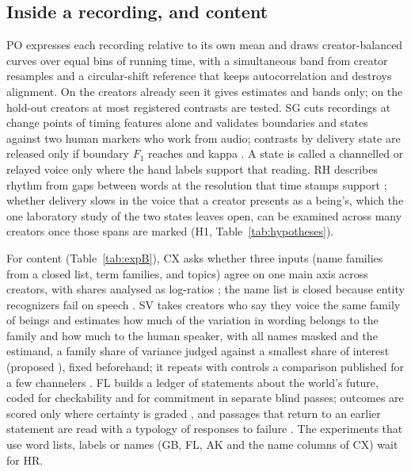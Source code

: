 \documentclass[letterpaper]{article} %
\newcommand{\expid}[1]{\textsc{#1}}
\begin{document}
\subsection{Inside a recording, and content}

\expid{PO} expresses each recording relative to its own mean and draws creator-balanced curves over \PoBins{} equal bins of running time, with a simultaneous band from \NResamples{} creator resamples and a circular-shift reference that keeps autocorrelation and destroys alignment. On the creators already seen it gives estimates and bands only; on the hold-out creators at most \PoMaxContrasts{} registered contrasts are tested. \expid{SG} cuts recordings at change points of timing features alone and validates boundaries and states against two human markers who work from audio; contrasts by delivery state are released only if boundary $F_1$ reaches \SgBoundaryGate{} and kappa \SgKappaGate. A state is called a channelled or relayed voice only where the hand labels support that reading. \expid{RH} describes rhythm from gaps between words at the resolution that time stamps support \cite{rousso2024tradition}; whether delivery slows in the voice that a creator presents as a being's, which the one laboratory study of the two states \cite{wahbeh2019physiological} leaves open, can be examined across many creators once those spans are marked (H1, Table~\ref{tab:hypotheses}).

For content (Table~\ref{tab:expB}), \expid{CX} asks whether three inputs (name families from a closed list, term families, and topics) agree on one main axis across creators, with shares analysed as log-ratios \cite{aitchison1982statistical,lovell2015proportionality}; the name list is closed because entity recognizers fail on speech \cite{szymanski2023ner}. \expid{SV} takes creators who say they voice the same family of beings and estimates how much of the variation in wording belongs to the family and how much to the human speaker, with all names masked and the estimand, a family share of variance judged against a smallest share of interest (proposed \SvSmallestShare), fixed beforehand; it repeats with controls a comparison published for a few channelers \cite{wahbeh2026semantic}. \expid{FL} builds a ledger of statements about the world's future, coded for checkability and for commitment in separate blind passes; outcomes are scored only where certainty is graded \cite{gneiting2007strictly}, and passages that return to an earlier statement are read with a typology of responses to failure \cite{dawson1999prophecy}. The experiments that use word lists, labels or names (\expid{GB}, \expid{FL}, \expid{AK} and the name columns of \expid{CX}) wait for \expid{HR}.
\end{document}
